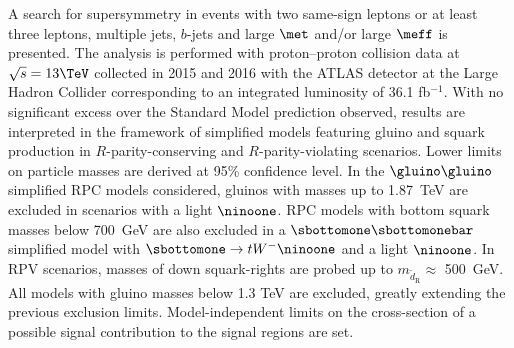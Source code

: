 A search for supersymmetry in events with two same-sign leptons or at least three leptons, multiple jets, 
$b$-jets and large $\met$ and/or large $\meff$ is presented. 
The analysis is performed with proton--proton collision data at $\sqrt{s}=13\TeV$ 
collected in 2015 and 2016 with the ATLAS detector at the Large Hadron Collider 
corresponding to an integrated luminosity of 36.1 fb$^{-1}$. 
With no significant excess over the Standard Model prediction observed,
results are interpreted in the framework of simplified models featuring gluino 
and squark production in $R$-parity-conserving and $R$-parity-violating scenarios. Lower limits on particle 
masses are derived at 95\% confidence level. 
In the $\gluino\gluino$ simplified RPC models considered, gluinos with masses up to 1.87~TeV
are excluded in scenarios with a light $\ninoone$. RPC models with bottom squark masses below 700~GeV
are also excluded in a $\sbottomone\sbottomonebar$ simplified model with $\sbottomone\to tW^-\ninoone$ and a light $\ninoone$. 
In RPV scenarios, masses of down squark-rights are probed up to $m_{\tilde d_\mathrm{R}}\approx$ 500~GeV. 
All models with gluino masses below 1.3 TeV are excluded, greatly extending the previous exclusion limits.
Model-independent limits on the cross-section of a possible signal contribution to the signal regions are set.
